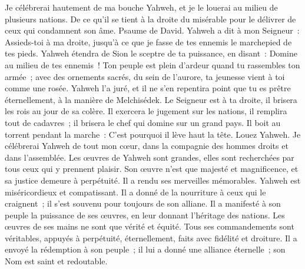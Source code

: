 \begin{multicols}{2}
Je célébrerai hautement de ma bouche Yahweh, et je le louerai au milieu de plusieurs nations.
De ce qu'il se tient à la droite du misérable pour le délivrer de ceux qui condamnent son âme.
\VerseOne{}Psaume de David. Yahweh a dit à mon Seigneur~: Assieds-toi à ma droite, jusqu'à ce que je fasse de tes ennemis le marchepied de tes pieds.
Yahweh étendra de Sion le sceptre de ta puissance, en disant~: Domine au milieu de tes ennemis~!
Ton peuple est plein d'ardeur quand tu rassembles ton armée~; avec des ornements sacrés, du sein de l'aurore, ta jeunesse vient à toi comme une rosée.
Yahweh l'a juré, et il ne s'en repentira point que tu es prêtre éternellement, à la manière de Melchisédek.
Le Seigneur est à ta droite, il brisera les rois au jour de sa colère.
Il exercera le jugement sur les nations, il remplira tout de cadavres~; il brisera le chef qui domine sur un grand pays.
Il boit au torrent pendant la marche~: C'est pourquoi il lève haut la tête.
\VerseOne{}Louez Yahweh.  Je célébrerai Yahweh de tout mon cœur,  dans la compagnie des hommes droits et dans l'assemblée.
 Les œuvres de Yahweh sont grandes,  elles sont recherchées par tous ceux qui y prennent plaisir.
 Son œuvre n'est que majesté et magnificence,  et sa justice demeure à perpétuité.
 Il a rendu ses merveilles mémorables.  Yahweh est miséricordieux et compatissant.
 Il a donné de la nourriture à ceux qui le craignent~;  il s'est souvenu pour toujours de son alliane.
 Il a manifesté à son peuple la puissance de ses œuvres,  en leur donnant l'héritage des nations.
 Les œuvres de ses mains ne sont que vérité et équité.  Tous ses commandements sont véritables,
 appuyés à perpétuité, éternellement,  faits avec fidélité et droiture.
 Il a envoyé la rédemption à son peuple~;  il lui a donné une alliance éternelle~;  son Nom est saint et redoutable.

\end{multicols}
